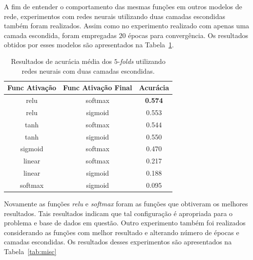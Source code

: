 \documentclass[conference]{IEEEtran}
\begin{document}
A fim de entender o comportamento das mesmas funções em outros modelos de rede, experimentos com redes neurais utilizando duas camadas escondidas também foram realizados. Assim como no experimento realizado com apenas uma camada escondida, foram empregadas $20$ épocas para convergência. Os resultados obtidos por esses modelos são apresentados na Tabela~\ref{tab:2hl}.

\begin{table}[h!]
	\centering	
	\begin{tabular}{ccc} \toprule
		\textbf{Func Ativação} & \textbf{Func Ativação Final} & \textbf{Acurácia} \\ \toprule 	
		relu                   & softmax                      & \textbf{0.574}             \\
		relu                   & sigmoid                      & 0.553             \\
		tanh                   & softmax                      & 0.544             \\
		tanh                   & sigmoid                      & 0.550             \\
		sigmoid                & softmax                      & 0.470             \\
		linear                 & softmax                      & 0.217             \\
		linear                 & sigmoid                      & 0.188             \\
		softmax                & sigmoid                      & 0.095             \\ \bottomrule      
	\end{tabular}
	\caption{Resultados de acurácia média dos $5$-\emph{folds} utilizando redes neurais com duas camadas escondidas.}
	\label{tab:2hl}
\end{table}

Novamente as funções \emph{relu} e \emph{softmax} foram as funções que obtiveram os melhores resultados. Tais resultados indicam que tal configuração é apropriada para o problema e base de dados em questão. Outro experimento também foi realizados considerando as funções com melhor resultado e alterando número de épocas e camadas escondidas. Os resultados desses experimentos são apresentados na Tabela~\ref{tab:misc} 
\end{document}
